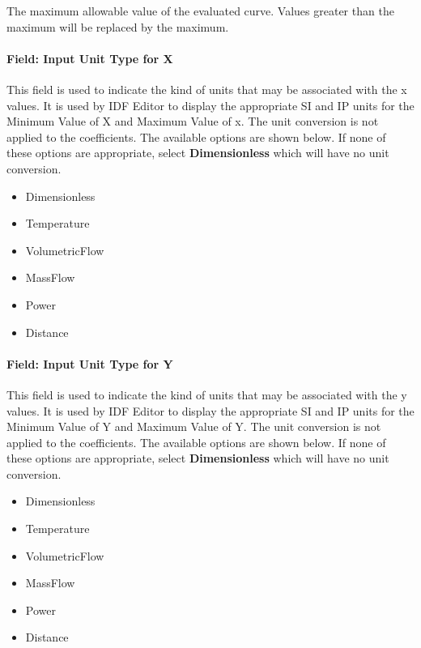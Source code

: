 The maximum allowable value of the evaluated curve. Values greater than the maximum will be replaced by the maximum.

\paragraph{Field: Input Unit Type for X}\label{field-input-unit-type-for-x-10}

This field is used to indicate the kind of units that may be associated with the x values. It is used by IDF Editor to display the appropriate SI and IP units for the Minimum Value of X and Maximum Value of x. The unit conversion is not applied to the coefficients. The available options are shown below. If none of these options are appropriate, select \textbf{Dimensionless} which will have no unit conversion.

\begin{itemize}
\item
  Dimensionless
\item
  Temperature
\item
  VolumetricFlow
\item
  MassFlow
\item
  Power
\item
  Distance
\end{itemize}

\paragraph{Field: Input Unit Type for Y}\label{field-input-unit-type-for-y-5}

This field is used to indicate the kind of units that may be associated with the y values. It is used by IDF Editor to display the appropriate SI and IP units for the Minimum Value of Y and Maximum Value of Y. The unit conversion is not applied to the coefficients. The available options are shown below. If none of these options are appropriate, select \textbf{Dimensionless} which will have no unit conversion.

\begin{itemize}
\item
  Dimensionless
\item
  Temperature
\item
  VolumetricFlow
\item
  MassFlow
\item
  Power
\item
  Distance
\end{itemize}

